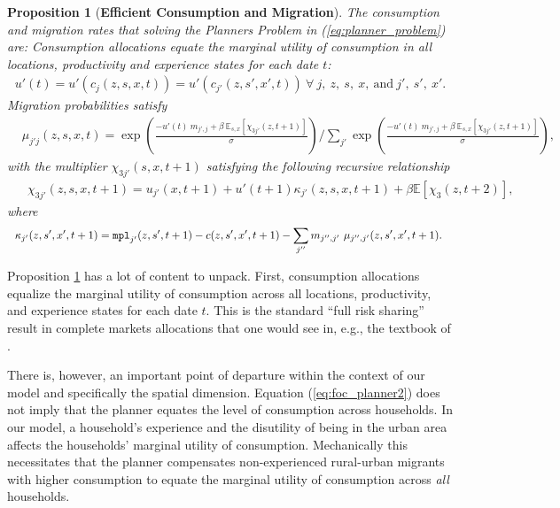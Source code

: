 \documentclass[12pt,pdftex]{article}
\newtheorem{proposition}{Proposition}
\begin{document}
\begin{onehalfspacing}
\begin{proposition}[\textbf{Efficient Consumption and Migration}] \label{prp:efficient} The consumption and migration rates that solving the Planners Problem in (\ref{eq:planner_problem}) are: Consumption allocations equate the marginal utility of consumption in all locations, productivity and experience states for each date $t$:
{\small
\begin{align}
u'(t) = u'(c_{j}(z, s, x, t)) = u'(c_{j'}(z, s', x', t)) \ \forall \ j, \ z, \ s, \ x, \ \mbox{and}  \ j', \ s', \ x'.
\label{eq:foc_planner2}
\end{align}
}
Migration probabilities satisfy
{\footnotesize
\begin{align}
& \mu_{j'j}(z,s,x,t)  =  \exp \left(\frac{- u'(t) \ m_{j',j} + \beta \ \mathbb{E}_{s,x}\left[\chi_{3j'}(z, t+1)\right]}{\sigma} \right)  \Bigg / \sum_{j'} \exp \left( \frac{- u'(t)\ m_{j',j} + \beta \  \mathbb{E}_{s,x}\left[\chi_{3j'}(z, t+1) \right]}{\sigma} \right), \label{eq:migration_prob}
\end{align}
}
with the multiplier $\chi_{3j'}(s, x, t+1)$ satisfying the following recursive relationship
{\small
\begin{align}
& \ \ \chi_{3j'}(z, s, x, t+1) =  u_{j'}(x, t+1) +  u'(t+1) \kappa_{j'}(z, s,x,t+1) + \beta \mathbb{E}\left[\chi_{3}(z, t+2) \right], \label{eq:dynamic_multiplier}
\end{align}}
where
{\small
\begin{align}
& \ \ \kappa_{j'}(z, s',x',t+1) = \mbox{\texttt{mpl}}_{j'}(z,s',t+1) - c(z, s',x',t+1) - \sum_{j''}  m_{j'',j'} \ \mu_{j'',j'}(z, s', x', t+1). \label{eq:kappa}
\end{align}}
\end{proposition}
Proposition \ref{prp:efficient} has a lot of content to unpack. First, consumption allocations equalize the marginal utility of consumption across all locations, productivity, and experience states for each date $t$. This is the standard ``full risk sharing'' result in complete markets allocations that one would see in, e.g., the textbook of \citet{ljsa03}.

There is, however, an important point of departure within the context of our model and specifically the spatial dimension. Equation (\ref{eq:foc_planner2}) does not imply that the planner equates the level of consumption across households. In our model, a household's experience and the disutility of being in the urban area affects the households' marginal utility of consumption. Mechanically this necessitates that the planner compensates non-experienced rural-urban migrants with higher consumption to equate the marginal utility of consumption across \emph{all} households.


\end{onehalfspacing}
\end{document}
